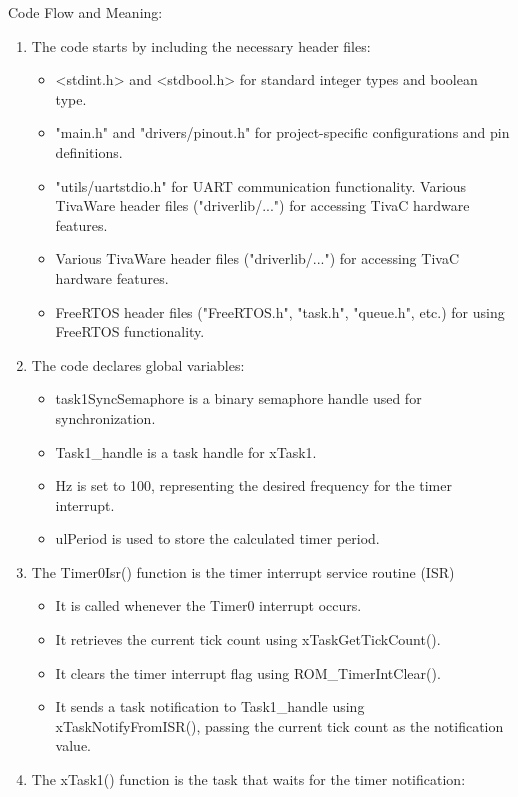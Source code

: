 \documentclass[a4paper,11pt]{article}%
\newenvironment{qanda}{\setlength{\parindent}{0pt}}{\bigskip}
\begin{document}
\begin{qanda}
	Code Flow and Meaning:
	\begin{enumerate}
		\item The code starts by including the necessary header files:
		\begin{itemize}
			\item <stdint.h> and <stdbool.h> for standard integer types and boolean type.
			\item "main.h" and "drivers/pinout.h" for project-specific configurations and pin definitions.
			\item "utils/uartstdio.h" for UART communication functionality.
			Various TivaWare header files ("driverlib/...") for accessing TivaC hardware features.
			\item Various TivaWare header files ("driverlib/...") for accessing TivaC hardware features.
			\item FreeRTOS header files ("FreeRTOS.h", "task.h", "queue.h", etc.) for using FreeRTOS functionality.
		\end{itemize}
		\item The code declares global variables:
		\begin{itemize}
			\item task1SyncSemaphore is a binary semaphore handle used for synchronization.
			\item Task1\_handle is a task handle for xTask1.
			\item Hz is set to 100, representing the desired frequency for the timer interrupt.
			\item ulPeriod is used to store the calculated timer period.
		\end{itemize}
		\item The Timer0Isr() function is the timer interrupt service routine (ISR)
		\begin{itemize}
			\item It is called whenever the Timer0 interrupt occurs.
			\item It retrieves the current tick count using xTaskGetTickCount().
			\item It clears the timer interrupt flag using ROM\_TimerIntClear().
			\item It sends a task notification to Task1\_handle using xTaskNotifyFromISR(), passing the current tick count as the notification value.
		\end{itemize}
		\item The xTask1() function is the task that waits for the timer notification:
		\begin{itemize}

\end{itemize}
\end{enumerate}
\end{qanda}
\end{document}
